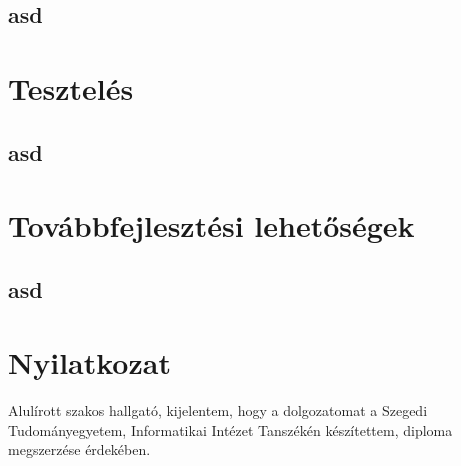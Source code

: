 \documentclass[12pt]{report}
\theoremstyle{definition}
\begin{document}
\section{asd}




\chapter{Tesztelés}
\section{asd}


\chapter{Továbbfejlesztési lehetőségek}
\section{asd}



\chapter*{Nyilatkozat}




\noindent
Alulírott \makebox[4cm]{\dotfill} szakos hallgató, kijelentem, hogy a dolgozatomat a Szegedi Tudományegyetem, Informatikai Intézet \makebox[4cm]{\dotfill} Tanszékén készítettem, \makebox[4cm]{\dotfill} diploma megszerzése érdekében.
\end{document}
